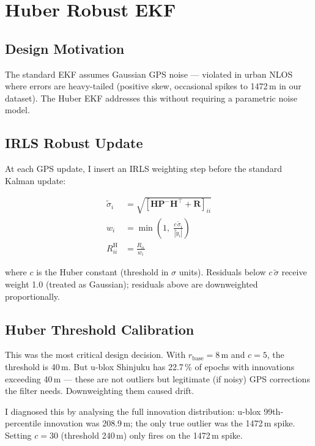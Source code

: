 \documentclass[12pt,a4paper]{article}
\begin{document}
\section{Huber Robust EKF}

\subsection{Design Motivation}

The standard EKF assumes Gaussian GPS noise — violated in urban NLOS where errors are
heavy-tailed (positive skew, occasional spikes to 1472\,m in our dataset).
The Huber EKF addresses this without requiring a parametric noise model.

\subsection{IRLS Robust Update}

At each GPS update, I insert an IRLS weighting step before the standard Kalman update:

\begin{align}
  \tilde{\sigma}_i &= \sqrt{[\mathbf{H}\mathbf{P}^-\mathbf{H}^\top + \mathbf{R}]_{ii}} \\
  w_i &= \min\!\left(1,\; \frac{c\,\tilde{\sigma}_i}{|\tilde{y}_i|}\right) \\
  R_{ii}^{\mathrm{H}} &= \frac{R_{ii}}{w_i}
\end{align}

where $c$ is the Huber constant (threshold in $\sigma$ units).
Residuals below $c\,\tilde{\sigma}$ receive weight 1.0 (treated as Gaussian);
residuals above are downweighted proportionally.

\subsection{Huber Threshold Calibration}

This was the most critical design decision.
With $r_\mathrm{base} = 8$\,m and $c = 5$, the threshold is 40\,m.
But u-blox Shinjuku has 22.7\,\% of epochs with innovations exceeding 40\,m —
these are not outliers but legitimate (if noisy) GPS corrections the filter needs.
Downweighting them caused drift.

I diagnosed this by analysing the full innovation distribution:
u-blox 99th-percentile innovation was 208.9\,m; the only true outlier was the 1472\,m
spike.
Setting $c = 30$ (threshold 240\,m) only fires on the 1472\,m spike.
\end{document}
